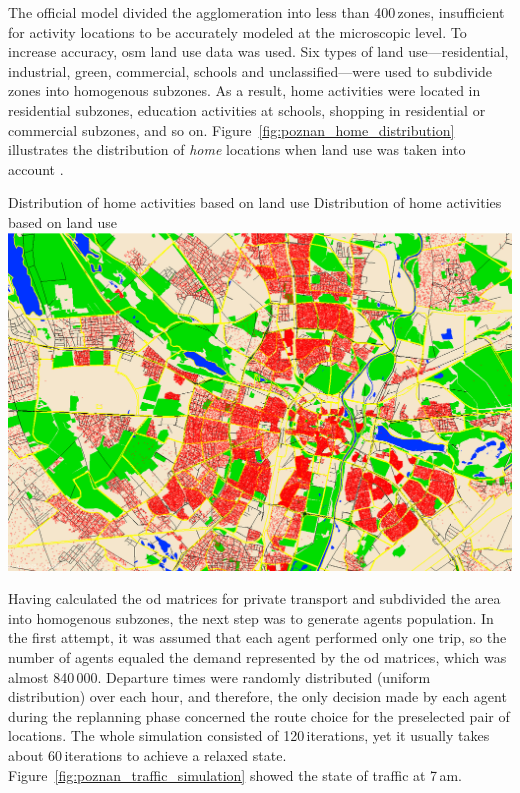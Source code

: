 The official model divided the agglomeration into less than 400\,zones, insufficient for activity locations to be accurately modeled at the microscopic level. To increase accuracy, \gls{osm} land use data was used. Six types of land use---residential, industrial, green, commercial, schools and unclassified---were used to subdivide zones into homogenous subzones. As a result, home activities were located in residential subzones, education activities at schools, shopping in residential or commercial subzones, and so on. Figure~\ref{fig:poznan_home_distribution} illustrates the distribution of \emph{home} locations when land use was taken into account \cite{PiatkowskiMaciejewski2013LandUse}.

\createfigure%
{Distribution of home activities based on land use}%
{Distribution of home activities based on land use}%
{\label{fig:poznan_home_distribution}}%
{\includegraphics[width=\textwidth, angle=0]{scenarios/figures/poznan_home_distribution}}%
{}%

Having calculated the \gls{od} matrices for private transport and subdivided the area into homogenous subzones, the next step was to generate agents population. In the first attempt, it was assumed that each agent performed only one trip, so the number of agents equaled the demand represented by the \gls{od} matrices, which was almost 840\,000. Departure times were randomly distributed (uniform distribution) over each hour, and therefore, the only decision made by each agent during the replanning phase concerned the route choice for the preselected pair of locations. The whole simulation consisted of 120\,iterations, yet it usually takes about 60\,iterations to achieve a relaxed state. Figure~\ref{fig:poznan_traffic_simulation} showed the state of traffic at 7\,am.

